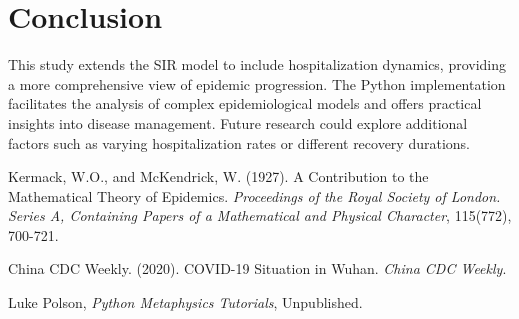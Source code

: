 \documentclass{article}
\begin{document}
\section{Conclusion}
This study extends the SIR model to include hospitalization dynamics, providing a more comprehensive view of epidemic progression. The Python implementation facilitates the analysis of complex epidemiological models and offers practical insights into disease management. Future research could explore additional factors such as varying hospitalization rates or different recovery durations.

\begin{thebibliography}{9}

Kermack, W.O., and McKendrick, W. (1927). A Contribution to the Mathematical Theory of Epidemics. \textit{Proceedings of the Royal Society of London. Series A, Containing Papers of a Mathematical and Physical Character}, 115(772), 700-721.

China CDC Weekly. (2020). COVID-19 Situation in Wuhan. \textit{China CDC Weekly}.

Luke Polson,
\textit{Python Metaphysics Tutorials},
Unpublished.

\end{thebibliography}
\end{document}
